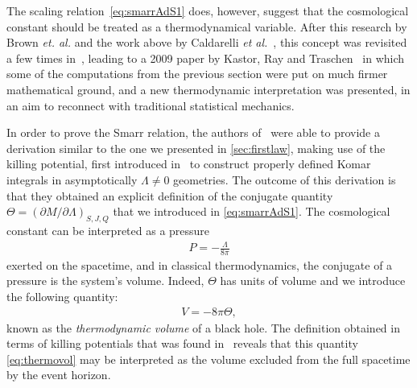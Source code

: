 \documentclass[
twoside,
openright,
frontopenright,
]{dmathesis}
\begin{document}
The scaling relation~\eqref{eq:smarrAdS1} does, however, suggest that the
cosmological constant should be treated as a thermodynamical variable. After
this research by Brown \emph{et. al.} and the work above by Caldarelli \emph{et
  al.}~\cite{Caldarelli:1999xj}, this concept was revisited a few times
in~\cite{Wang:2006eb,Sekiwa:2006qj,Wang:2006bn,LarranagaRubio:2007fly}, leading
to a 2009 paper by Kastor, Ray and Traschen~\cite{Kastor:2009wy} in which some
of the computations from the previous section were put on much firmer
mathematical ground, and a new thermodynamic interpretation was presented, in an
aim to reconnect with traditional statistical mechanics.

In order to prove the Smarr relation, the authors of~\cite{Kastor:2009wy} were
able to provide a derivation similar to the one we presented in
\cref{sec:firstlaw}, making use of the killing potential, first introduced
in~\cite{Bazanski:1990qd,Kastor:2008xb} to construct properly defined Komar
integrals in asymptotically $\Lambda\neq 0$ geometries. The outcome of this
derivation is that they obtained an explicit definition of the conjugate
quantity $\Theta = (\partial M/\partial \Lambda)_{S,J,Q}$ that we introduced in
\cref{eq:smarrAdS1}. The cosmological constant can be interpreted as a pressure
\begin{align}
  P = -\frac{\Lambda}{8\pi}
\end{align}
exerted on the spacetime, and in classical thermodynamics, the conjugate of a
pressure is the system's volume. Indeed, $\Theta$ has units of volume and we
introduce the following quantity:
\begin{align}
  \label{eq:thermovol}
  V=-8\pi\Theta,
\end{align}
known as the \emph{thermodynamic volume} of a black hole. The definition
obtained in terms of killing potentials that was found in~\cite{Kastor:2009wy}
reveals that this quantity \eqref{eq:thermovol} may be interpreted as the volume
excluded from the full spacetime by the event horizon.
\end{document}
